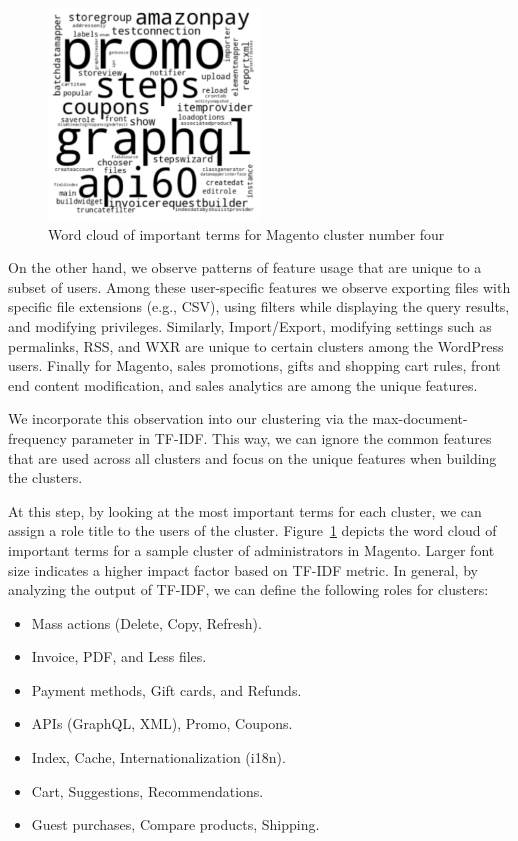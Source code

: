 \begin{figure}[t]
    \centering
    \includegraphics[width=0.5\textwidth]{figures/dbltr/magento_wordcloud.pdf}
    \caption{Word cloud of important terms for Magento cluster number four}
    \label{fig:magento_wordcloud}
\end{figure}

On the other hand, we observe patterns of feature usage that are unique to a subset of users. 
Among these user-specific features we observe exporting files with specific file extensions (e.g., CSV), using filters while displaying the query results, and modifying privileges. 
Similarly, Import/Export, modifying settings such as permalinks, RSS, and WXR are unique to certain clusters among the WordPress users. 
Finally for Magento, sales promotions, gifts and shopping cart rules, front end content modification, and sales analytics are among the unique features. 

We incorporate this observation into our clustering via the max-document-frequency parameter in TF-IDF. 
This way, we can ignore the common features that are used across all clusters and focus on the unique features when building the clusters. 

At this step, by looking at the most important terms for each cluster, we can assign a role title to the users of the cluster. 
Figure~\ref{fig:magento_wordcloud} depicts the word cloud of important terms for a sample cluster of administrators in Magento. 
Larger font size indicates a higher impact factor based on TF-IDF metric. In general, by analyzing the output of TF-IDF, we can define the following roles for clusters:

\begin{itemize}
    \item Mass actions (Delete, Copy, Refresh).
    \item Invoice, PDF, and Less files.
    \item Payment methods, Gift cards, and Refunds.
    \item APIs (GraphQL, XML), Promo, Coupons.
    \item Index, Cache, Internationalization (i18n).
    \item Cart, Suggestions, Recommendations.
    \item Guest purchases, Compare products, Shipping.
\end{itemize}

